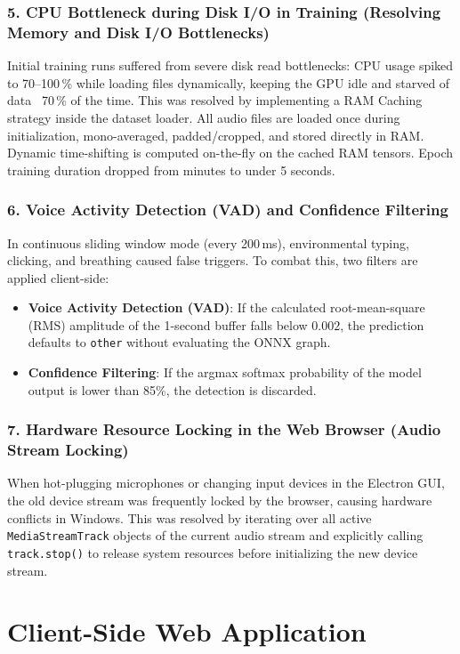 \documentclass[11pt,a4paper]{article}
\begin{document}
\subsubsection{5. CPU Bottleneck during Disk I/O in Training (Resolving Memory and Disk I/O Bottlenecks)}
Initial training runs suffered from severe disk read bottlenecks: CPU usage spiked to 70--100\,\% while loading files dynamically, keeping the GPU idle and starved of data ~70\,\% of the time. This was resolved by implementing a RAM Caching strategy inside the dataset loader. All audio files are loaded once during initialization, mono-averaged, padded/cropped, and stored directly in RAM. Dynamic time-shifting is computed on-the-fly on the cached RAM tensors. Epoch training duration dropped from minutes to under 5 seconds.

\subsubsection{6. Voice Activity Detection (VAD) and Confidence Filtering}
In continuous sliding window mode (every 200\,ms), environmental typing, clicking, and breathing caused false triggers. To combat this, two filters are applied client-side:
\begin{itemize}
    \item \textbf{Voice Activity Detection (VAD)}: If the calculated root-mean-square (RMS) amplitude of the 1-second buffer falls below $0.002$, the prediction defaults to \texttt{other} without evaluating the ONNX graph.
    \item \textbf{Confidence Filtering}: If the argmax softmax probability of the model output is lower than 85\%, the detection is discarded.
\end{itemize}

\subsubsection{7. Hardware Resource Locking in the Web Browser (Audio Stream Locking)}
When hot-plugging microphones or changing input devices in the Electron GUI, the old device stream was frequently locked by the browser, causing hardware conflicts in Windows. This was resolved by iterating over all active \texttt{MediaStreamTrack} objects of the current audio stream and explicitly calling \texttt{track.stop()} to release system resources before initializing the new device stream.

\newpage
\section{Client-Side Web Application}
\end{document}
